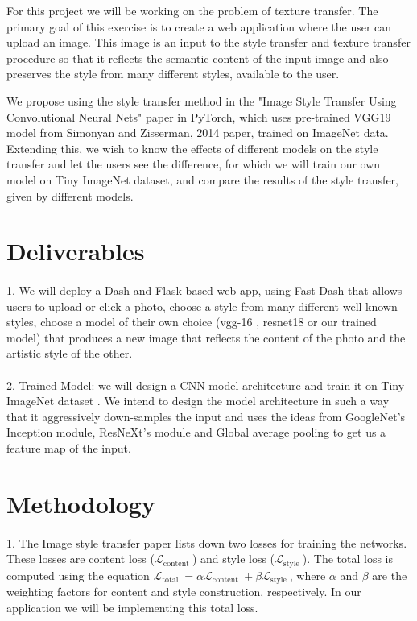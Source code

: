 For this project we will be working on the problem of texture transfer. The primary goal of this exercise is to create a web application where the user can upload an image. This image is an input to the style transfer and texture transfer procedure so that it reflects the semantic content of the input image and also preserves the style from many different styles, available to the user. 

We propose using the style transfer method in the "Image Style Transfer Using Convolutional Neural Nets" paper \cite{image_style_transfer} in PyTorch, which uses pre-trained VGG19 \cite{vgg16} model from Simonyan and Zisserman, 2014 paper, trained on ImageNet data. Extending this, we wish to know the effects of different models on the style transfer and let the users see the difference, for which we will train our own model on Tiny ImageNet dataset, and compare the results of the style transfer, given by different models. 


\section{Deliverables}
\paragraph{}
1. We will deploy a Dash and Flask-based web app, using Fast Dash \cite{fast_dash} that allows users to upload or click a photo, choose a style from many different well-known styles, choose a model of their own choice (vgg-16 \cite{vgg16}, resnet18 \cite{resnet18} or our trained model) that produces a new image that reflects the content of the photo and the artistic style of the other.
\paragraph{}
2. Trained Model: we will design a CNN model architecture and train it on Tiny ImageNet dataset \cite{tiny_imagenet}. We intend to design the model architecture in such a way that it aggressively down-samples the input and uses the ideas from GoogleNet's Inception module, ResNeXt's module and Global average pooling to get us a feature map of the input.


\section{Methodology}
\paragraph{}
1. The Image style transfer paper lists down two losses for training the networks. These losses are content loss ($\mathcal{L}_{\text {content }}$) and style loss ($\mathcal{L}_{\text {style }}$). The total loss is computed using the equation $\mathcal{L}_{\text {total }}=\alpha \mathcal{L}_{\text {content }}+\beta \mathcal{L}_{\text {style }}$, where $\alpha$ and $\beta$ are the weighting factors for content and style construction, respectively. In our application we will be implementing this total loss.

